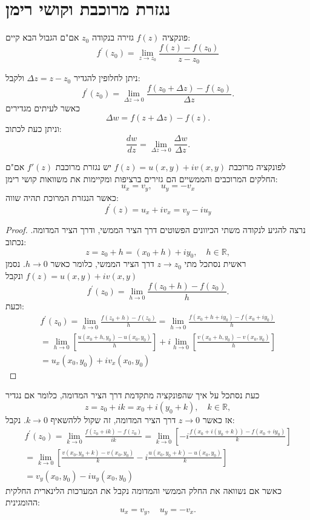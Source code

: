 \documentclass{tstextbook}
\begin{document}
\section{נגזרת מרוכבת וקושי רימן}

\begin{definition}
פונקציה \(f(z)\) גזירה בנקודה \(z_{0}\) אם"ם הגבול הבא קיים:
$$f^{\prime}(z_{0})=\operatorname*{lim}_{z\to z_{0}}{\frac{f(z)-f(z_{0})}{z-z_{0}}}$$

\end{definition}
ניתן לחלופין להגדיר \(\Delta z=z-z_{0}\) ולקבל:
$$f^{\prime}(z_{0})=\operatorname*{lim}_{\Delta z\to0}{\frac{f(z_{0}+\Delta z)-f(z_{0})}{\Delta z}}.$$
כאשר לעיתים מגדירים
$$\Delta w=f(z+\Delta z)-f(z).$$
וניתן כעת לכתוב:
$$\frac{d w}{d z}=\operatorname*{lim}_{\Delta z\to0}\frac{\Delta w}{\Delta z}.$$

\begin{theorem}
לפונקציה מרוכבת \(f(z)=u(x,y)+iv(x,y)\) יש נגזרת מרוכבת \(f'(z)\) אם"ם החלקים המרוכבים והממשיים הם גזירים ברציפות ומקיימות את משוואות קושי רימן:
$$u_{x}=v_{y},\quad u_{y}=-v_{x}$$
כאשר הנגזרת המרוכת תהיה שווה:
$$f^{\prime}(z)=u_{x}+i v_{x}=v_{y}-i u_{y}$$

\end{theorem}
\begin{proof}
נרצה להגיע לנקודה משתי הכיוונים הפשוטים דרך הציר הממשי, ודרך הציר המדומה. נכתוב:
$$z=z_{0}+h=(x_{0}+h)+i y_{0},\quad h\in\mathbb{R},$$
ראשית נסתכל מתי \(z\to z_{0}\) דרך הציר הממשי, כלומר כאשר \(h\to 0\).
נסמן \(f(z)=u(x,y)+iv(x,y)\) ונקבל $$f^{\prime}(z_{0})=\operatorname*{lim}_{h\to0}{\frac{f(z_{0}+h)-f(z_{0})}{h}}.$$
וכעת:
\begin{gather*}{f^{\prime}(z_{0})=\operatorname*{lim}_{h\to0}{\frac{f(z_{0}+h)-f(z_{0})}{h}}=\operatorname*{lim}_{h\to0}{\frac{f(x_{0}+h+i y_{0})-f(x_{0}+i y_{0})}{h}}}\\ {=\operatorname*{lim}_{h\to0}\left[{\frac{u\left(x_{0}+h,y_{0}\right)-u\left(x_{0},y_{0}\right)}{h}}\right]+i\operatorname*{lim}_{h\to0}\left[{\frac{v\left(x_{0}+h,y_{0}\right)-v\left(x_{0},y_{0}\right)}{h}}\right]}\\ {=u_{x}(x_{0},y_{0})+i v_{x}(x_{0},y_{0})}\end{gather*}

\end{proof}
כעת נסתכל על איך שהפונקציה מתקדמת דרך הציר המדומה, כלומר אם נגדיר
$$z=z_{0}+i k=x_{0}+i(y_{0}+k),\quad k\in\mathbb{R},$$
אז כאשר \(z\to 0\) דרך הציר המדומה, זה שקול ללהשאיף \(k\to 0\). נקבל:
\begin{gather*}{f^{\prime}(z_{0})=\operatorname*{lim}_{k\to0}{\frac{f(z_{0}+i k)-f(z_{0})}{i k}}=\operatorname*{lim}_{k\to0}\left[-i{\frac{f(x_{0}+i(y_{0}+k))-f(x_{0}+i y_{0})}{k}}\right]}\\ {=\operatorname*{lim}_{k\to0}\left[{\frac{v\left(x_{0},y_{0}+k\right)-v\left(x_{0},y_{0}\right)}{k}}-i{\frac{u\left(x_{0},y_{0}+k\right)-u\left(x_{0},y_{0}\right)}{k}}\right]}\\ {=v_{y}(x_{0},y_{0})-i u_{y}(x_{0},y_{0})}\end{gather*}
כאשר אם נשוואה את החלק הממשי והמדומה נקבל את המערכות הלינארית החלקית ההומגינית:
$$u_{x}=v_{y},\quad u_{y}=-v_{x}.$$
\end{document}
